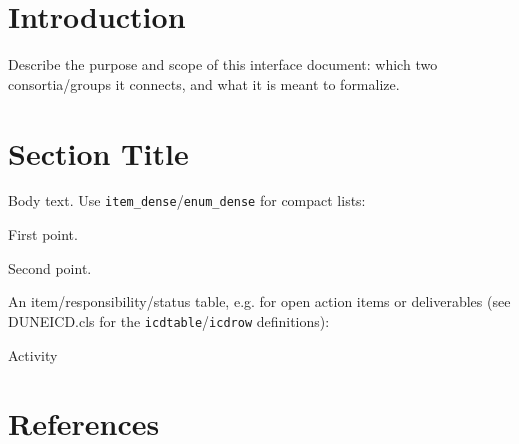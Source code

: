 \documentclass[letterpaper]{DUNEICD}
\begin{document}
\makeICDcover

\begin{revisionhistory}
\end{revisionhistory}

\tableofcontents
\clearpage

\section{Introduction}
\label{sec:introduction}

Describe the purpose and scope of this interface document: which two
consortia/groups it connects, and what it is meant to formalize.

\section{Section Title}
\label{sec:section-one}

Body text.  Use \texttt{item\_dense}/\texttt{enum\_dense} for compact lists:

\begin{item_dense}
  \item First point.
  \item Second point.
\end{item_dense}

An item/responsibility/status table, e.g. for open action items or
deliverables (see DUNEICD.cls for the \texttt{icdtable}/\texttt{icdrow}
definitions):

\begin{icdtable}{Activity}
\end{icdtable}

\section{References}
\label{sec:references}
\end{document}
